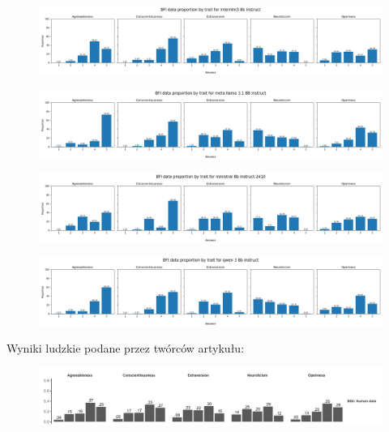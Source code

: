 \documentclass{article}
\begin{document}
\begin{figure}[H]
    \centering
    \includegraphics[width=0.7 \linewidth]{../Prompt_code/plots/internlm3-8b-instruct/bfi_distribution.png}
\end{figure}

\begin{figure}[H]
    \centering
    \includegraphics[width=0.7 \linewidth]{../Prompt_code/plots/meta-llama-3.1-8B-instruct/bfi_distribution.png}
\end{figure}

\begin{figure}[H]
    \centering
    \includegraphics[width=0.7 \linewidth]{../Prompt_code/plots/ministral-8b-instruct-2410/bfi_distribution.png}
\end{figure}

\begin{figure}[H]
    \centering
    \includegraphics[width=0.7 \linewidth]{../Prompt_code/plots/qwen-3-8b-instruct/bfi_distribution.png}
\end{figure}

Wyniki ludzkie podane przez twórców artykułu:

\begin{figure}[H]
    \centering
    \includegraphics[width=0.7 \linewidth]{./article_data/human_distr.png}
\end{figure}
\end{document}
